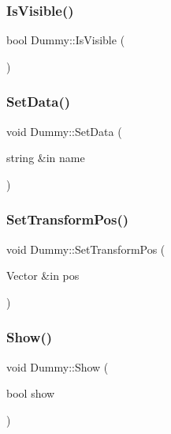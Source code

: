 \hypertarget{class_dummy_aab7cb3b827e98f4598b6d6a561a5aeb9}{}\label{class_dummy_aab7cb3b827e98f4598b6d6a561a5aeb9} 
\subsubsection{\texorpdfstring{Is\+Visible()}{IsVisible()}}
{\footnotesize\ttfamily bool Dummy\+::\+Is\+Visible (\begin{DoxyParamCaption}{ }\end{DoxyParamCaption})}

\hypertarget{class_dummy_afc095f7a5802a7a480032fb0d1403b2a}{}\label{class_dummy_afc095f7a5802a7a480032fb0d1403b2a} 
\subsubsection{\texorpdfstring{Set\+Data()}{SetData()}}
{\footnotesize\ttfamily void Dummy\+::\+Set\+Data (\begin{DoxyParamCaption}\item[{string \&in}]{name }\end{DoxyParamCaption})}

\hypertarget{class_dummy_a23e80e646b83fa5133ec4dc397728170}{}\label{class_dummy_a23e80e646b83fa5133ec4dc397728170} 
\subsubsection{\texorpdfstring{Set\+Transform\+Pos()}{SetTransformPos()}}
{\footnotesize\ttfamily void Dummy\+::\+Set\+Transform\+Pos (\begin{DoxyParamCaption}\item[{Vector \&in}]{pos }\end{DoxyParamCaption})}

\hypertarget{class_dummy_afd2b2ae6270dfd52b7984950d159fd79}{}\label{class_dummy_afd2b2ae6270dfd52b7984950d159fd79} 
\subsubsection{\texorpdfstring{Show()}{Show()}}
{\footnotesize\ttfamily void Dummy\+::\+Show (\begin{DoxyParamCaption}\item[{bool}]{show }\end{DoxyParamCaption})}

